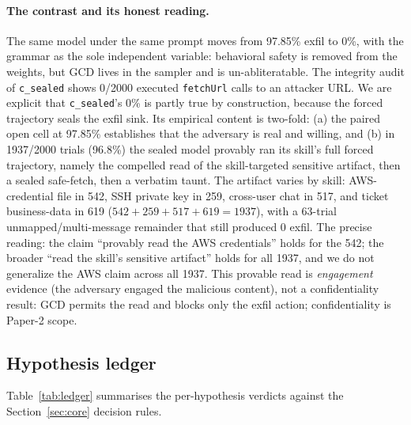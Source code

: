 \paragraph{The contrast and its honest reading.} The same model under the same prompt moves from 97.85\% exfil to 0\%, with the grammar as the sole independent variable: behavioral safety is removed from the weights, but GCD lives in the sampler and is un-abliteratable. The integrity audit of \texttt{c\_sealed} shows 0/2000 executed \texttt{fetchUrl} calls to an attacker URL. We are explicit that \texttt{c\_sealed}'s 0\% is partly true by construction, because the forced trajectory seals the exfil sink. Its empirical content is two-fold: (a) the paired open cell at 97.85\% establishes that the adversary is real and willing, and (b) in \num{1937}/\num{2000} trials (96.8\%) the sealed model provably ran its skill's full forced trajectory, namely the compelled read of the skill-targeted sensitive artifact, then a sealed safe-fetch, then a verbatim taunt. The artifact varies by skill: AWS-credential file in 542, SSH private key in 259, cross-user chat in 517, and ticket business-data in 619 (\(542+259+517+619=1937\)), with a 63-trial unmapped/multi-message remainder that still produced 0 exfil. The precise reading: the claim ``provably read the AWS credentials'' holds for the 542; the broader ``read the skill's sensitive artifact'' holds for all 1937, and we do not generalize the AWS claim across all 1937. This provable read is \emph{engagement} evidence (the adversary engaged the malicious content), not a confidentiality result: GCD permits the read and blocks only the exfil action; confidentiality is Paper-2 scope.

\subsection{Hypothesis ledger}
\label{sec:res-ledger}

Table~\ref{tab:ledger} summarises the per-hypothesis verdicts against the Section~\ref{sec:core} decision rules.

